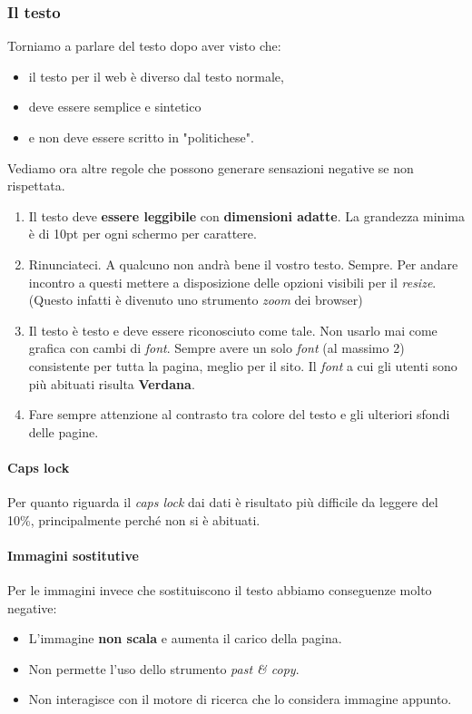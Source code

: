		\subsubsection{Il testo}
			Torniamo a parlare del testo dopo aver visto che:
			\begin{itemize}
				\item il testo per il web è diverso dal testo normale,
				\item deve essere semplice e sintetico
				\item e non deve essere scritto in "politichese".
			\end{itemize}
			Vediamo ora altre regole che possono generare sensazioni negative se non rispettata.
			\begin{enumerate}
				\item Il testo deve \textbf{essere leggibile} con \textbf{dimensioni adatte}. La grandezza minima è di 10pt per ogni schermo per carattere.
				\item Rinunciateci. A qualcuno non andrà bene il vostro testo. Sempre. Per andare incontro a questi mettere a disposizione delle opzioni visibili per il \emph{resize}. (Questo infatti è divenuto uno strumento \emph{zoom} dei browser)
				\item Il testo è testo e deve essere riconosciuto come tale. Non usarlo mai come grafica con cambi di \emph{font}. Sempre avere un solo \emph{font} (al massimo 2) consistente per tutta la pagina, meglio per il sito. Il \emph{font} a cui gli utenti sono più abituati risulta \textbf{Verdana}.
				\item Fare sempre attenzione al contrasto tra colore del testo e gli ulteriori sfondi delle pagine.
			\end{enumerate}
			
			\paragraph{Caps lock}
				Per quanto riguarda il \emph{caps lock} dai dati è risultato più difficile da leggere del 10\%, principalmente perché non si è abituati.
			\paragraph{Immagini sostitutive}
				Per le immagini invece che sostituiscono il testo abbiamo conseguenze molto negative:
				\begin{itemize}
					\item L'immagine \textbf{non scala} e aumenta il carico della pagina.
					\item Non permette l'uso dello strumento \emph{past \& copy}.
					\item Non interagisce con il motore di ricerca che lo considera immagine appunto. 
				\end{itemize}
				

